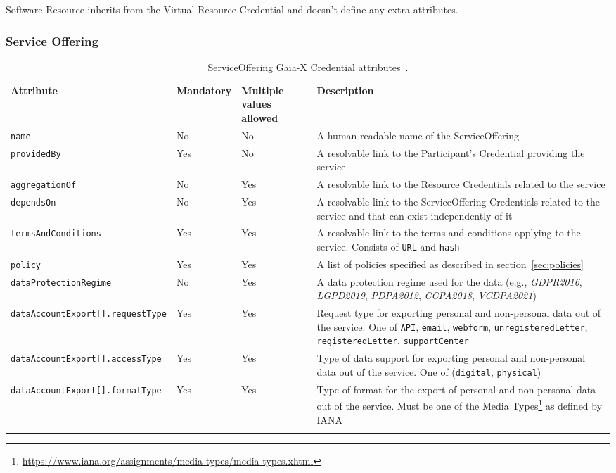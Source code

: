 Software Resource inherits from the Virtual Resource Credential and doesn't define any extra attributes.

\subsubsection{Service Offering}

\begin{longtable}{ |p{4cm}|p{2cm}|p{2cm}|p{7cm}| }
    \hhline{----}
    \textbf{Attribute} & \textbf{Mandatory} & \textbf{Multiple values allowed} & \textbf{Description}\\
    \hhline{----}
    \texttt{name} & No & No & A human readable name of the ServiceOffering\\
    \hhline{----}
    \texttt{providedBy} & Yes & No & A resolvable link to the Participant's Credential providing the service\\
    \hhline{----}
    \texttt{aggregationOf} & No & Yes & A resolvable link to the Resource Credentials related to the service\\
    \hhline{----}
    \texttt{dependsOn} & No & Yes & A resolvable link to the ServiceOffering Credentials related to the service and that can exist independently of it\\
    \hhline{----}
    \texttt{termsAndConditions} & Yes & Yes & A resolvable link to the terms and conditions applying to the service.
    Consists of \texttt{URL} and \texttt{hash}\\
    \hhline{----}
    \texttt{policy} & Yes & Yes & A list of policies specified as described in section~\ref{sec:policies}\\
    \hhline{----}
    \texttt{dataProtectionRegime} & No & Yes & A data protection regime used for the data (e.g., \textit{GDPR2016}, \textit{LGPD2019}, \textit{PDPA2012}, \textit{CCPA2018}, \textit{VCDPA2021})\\
    \hhline{----}
    \texttt{dataAccountExport[].requestType} & Yes & Yes & Request type for exporting personal and non-personal data out of the service.
    One of \texttt{API}, \texttt{email}, \texttt{webform}, \texttt{unregisteredLetter}, \texttt{registeredLetter}, \texttt{supportCenter}\\
    \hhline{----}
    \texttt{dataAccountExport[].accessType} & Yes & Yes & Type of data support for exporting personal and non-personal data out of the service.
    One of (\texttt{digital}, \texttt{physical})\\
    \hhline{----}
    \texttt{dataAccountExport[].formatType} & Yes & Yes & Type of format for the export of personal and non-personal data out of the service.
    Must be one of the Media Types\footnote{\url{https://www.iana.org/assignments/media-types/media-types.xhtml}} as defined by IANA\\
    \hhline{----}
    \caption{ServiceOffering Gaia-X Credential attributes~\cite{gaiax_trust_framework}.}
    \label{tab:service_offering}
\end{longtable}

